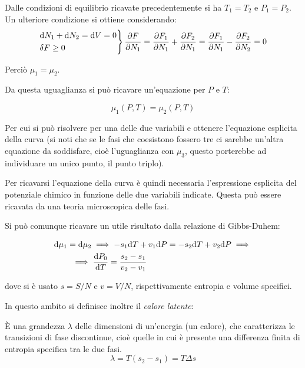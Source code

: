 Dalle condizioni di equilibrio ricavate precedentemente si ha $T_1 = T_2$ e $P_1 = P_2$. Un ulteriore condizione si ottiene considerando:
\begin{align*}
\begin{rcases*}
\dd N_1 + \dd N_2 = \dd V = 0\\
\delta F \geq 0
\end{rcases*}
\frac{\partial F}{\partial N_1} = \frac{\partial F_1}{\partial N_1} + \frac{\partial F_2}{\partial N_1} = \frac{\partial F_1}{\partial N_1} - \frac{\partial F_2}{\partial N_2} = 0
\end{align*}

\noindent Perciò $\mu_1 = \mu_2$.

Da questa uguaglianza si può ricavare un'equazione per $P$ e $T$:

\begin{equation*}
\mu_1 (P,T) = \mu_2 (P,T)
\end{equation*}

Per cui si può risolvere per una delle due variabili e ottenere l'equazione esplicita della curva (si noti che se le fasi che coesistono fossero tre ci sarebbe un'altra equazione da soddisfare, cioè l'uguaglianza con $\mu_3$, questo porterebbe ad individuare un unico punto, il punto triplo).

Per ricavarsi l'equazione della curva è quindi necessaria l'espressione esplicita del potenziale chimico in funzione delle due variabili indicate. Questa può essere ricavata da una teoria microscopica delle fasi.

Si può comunque ricavare un utile risultato dalla relazione di Gibbs-Duhem:

\begin{align*}
&\dd \mu_1 = \dd \mu_2 \implies -s_1 \dd T + v_1 \dd P = -s_2 \dd T + v_2 \dd P \implies \\
&\qquad \implies \derivative{ P_0}{T} = \frac{s_2 - s_1}{v_2 - v_1}
\end{align*}

\noindent dove si è usato $s = S/N$ e $v = V/N$, rispettivamente entropia e volume specifici.

In questo ambito si definisce inoltre il \textit{calore latente}:

\begin{defn}
	\`E una grandezza $\lambda$ delle dimensioni di un'energia (un calore), che caratterizza le transizioni di fase discontinue, cioè quelle in cui è presente una differenza finita di entropia specifica tra le due fasi.
	\begin{equation*}
		\lambda = T(s_2 - s_1) = T \Delta s
	\end{equation*} 
\end{defn}


